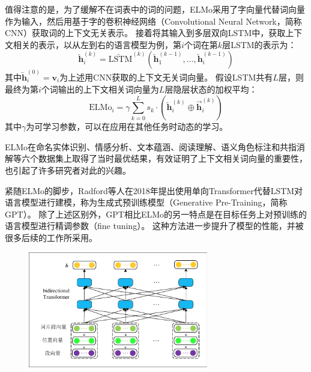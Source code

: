 值得注意的是，为了缓解不在词表中的词的问题，ELMo采用了字向量代替词向量作为输入，然后用基于字的卷积神经网络（Convolutional Neural Network，简称CNN）获取词的上下文无关表示。
接着将其输入到多层双向LSTM中，获取上下文相关的表示，以从左到右的语言模型为例，第$i$个词在第$k$层LSTM的表示为：
\begin{equation}
    \overleftarrow{\bm{h}}_i^{(k)} = \overleftarrow{\textrm{LSTM}}^{(k)}(\overleftarrow{\bm{h}}_1^{(k-1)},\dots,\overleftarrow{\bm{h}}_i^{(k-1)})
\end{equation}
其中$\overleftarrow{\bm{h}}_i^{(0)}=\bm{v}_i$为上述用CNN获取的上下文无关词向量。
假设LSTM共有$L$层，则最终为第$i$个词输出的上下文相关词向量为$L$层隐层状态的加权平均：
\begin{equation}
    \textrm{ELMo}_i = \gamma \sum_{k=0}^{L}s_k \cdot (\overleftarrow{\bm{h}}_i^{(k)}\oplus\overrightarrow{\bm{h}}_i^{(k)})
\end{equation}
其中$\gamma$为可学习参数，可以在应用在其他任务时动态的学习。

ELMo在命名实体识别\cite{tjong-kim-sang-de-meulder-2003-introduction}、情感分析\cite{socher-etal-2013-recursive}、文本蕴涵\cite{bowman-etal-2015-large}、阅读理解\cite{rajpurkar-etal-2016-squad}、语义角色标注\cite{pradhan-etal-2013-towards}和共指消解\cite{pradhan-etal-2012-conll}等六个数据集上取得了当时最优结果，有效证明了上下文相关词向量的重要性，也引起了许多研究者对此的兴趣。

紧随ELMo的脚步，Radford等人在2018年提出使用单向Transformer代替LSTM对语言模型进行建模，称为生成式预训练模型（Generative Pre-Training，简称GPT）\cite{radford-etal-2018-improving}。
除了上述区别外，GPT相比ELMo的另一特点是在目标任务上对预训练的语言模型进行精调参数（fine tuning）。
这种方法进一步提升了模型的性能，并被很多后续的工作所采用。

\begin{figure}[htbp]
    \centering
    \includegraphics[width=0.7\textwidth]{figures/bert.pdf}
\end{figure}

